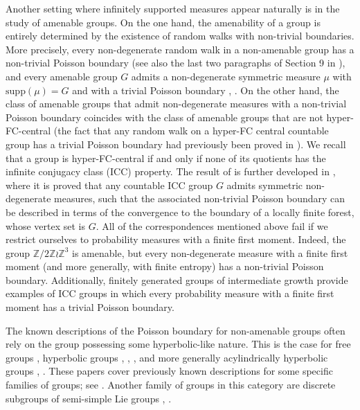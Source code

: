 \documentclass[reqno,oneside,11pt]{amsart}
\newcommand{\Z}{\mathbb{Z}}
\newcommand{\supp}[1]{\mathrm{supp}(#1)}
\theoremstyle{plain}
\theoremstyle{definition}
\begin{document}
Another setting where infinitely supported measures appear naturally is in the study of amenable groups. On the one hand, the amenability of a group is entirely determined by the existence of random walks with non-trivial boundaries. More precisely, every non-degenerate random walk in a non-amenable group has a non-trivial Poisson boundary \cite[Proposition II.1]{Azencott1970} (see also the last two paragraphs of Section 9 in \cite{Furstenberg1973}), and every amenable group $G$ admits a non-degenerate symmetric measure $\mu$ with $\supp{\mu}=G$ and with a trivial Poisson boundary \cite[Theorem 1.10]{Rosenblatt1981}, \cite[Theorem 4.4]{KaimanovcihVershik1983}. On the other hand, the class of amenable groups that admit non-degenerate measures with a non-trivial Poisson boundary coincides with the class of amenable groups that are not hyper-FC-central \cite[Theorem 1]{FrischHartmanTamuzVahidi2019} (the fact that any random walk on a hyper-FC central countable group has a trivial Poisson boundary had previously been proved in \cite{LinZaidenberg1998,Jaworski2004}). We recall that a group is hyper-FC-central if and only if none of its quotients has the infinite conjugacy class (ICC) property. The result of \cite{FrischHartmanTamuzVahidi2019} is further developed in \cite[Theorem A]{ErschlerKaimanovich2023}, where it is proved that any countable ICC group $G$ admits symmetric non-degenerate measures, such that the associated non-trivial Poisson boundary can be described in terms of the convergence to the boundary of a locally finite forest, whose vertex set is $G$. All of the correspondences mentioned above fail if we restrict ourselves to probability measures with a finite first moment. Indeed, the group $\Z/2\Z\wr \Z^3$ is amenable, but every non-degenerate measure with a finite first moment (and more generally, with finite entropy) has a non-trivial Poisson boundary. Additionally, finitely generated groups of intermediate growth provide examples of ICC groups in which every probability measure with a finite first moment has a trivial Poisson boundary.


The known descriptions of the Poisson boundary for non-amenable groups often rely on the group possessing some hyperbolic-like nature. This is the case for free groups \cite{DynkinMaljutov1961,Derrienic1975}, hyperbolic groups \cite{Ancona1987}, \cite[Theorems 7.4 and 7.7]{Kaimanovich2000}, \cite[Theorem 1.1]{ChawlaForghaniFrischTiozzo2022}, and more generally acylindrically hyperbolic groups \cite[Theorem 1.5]{MaherTiozzo2018}, \cite[Theorem 1.2]{ChawlaForghaniFrischTiozzo2022}. These papers cover previously known descriptions for some specific families of groups; see \cite{Woess1989,KaimanovichMasur1996,FarbMasur1998,GauteroMatheus2012,Horbez2016}. Another family of groups in this category are discrete subgroups of semi-simple Lie groups \cite{Furstenberg1971,Ledrappier1985}, \cite[Theorems 10.3 and 10.7]{Kaimanovich2000}.
\end{document}
